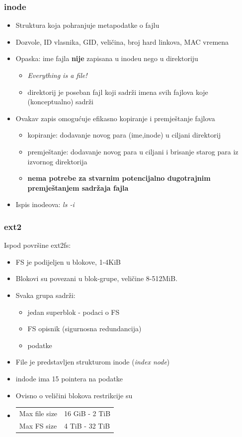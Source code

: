 \documentclass[t]{beamer}
\begin{document}
\begin{frame}
	\frametitle{inode}
	\begin{itemize}
		\item Struktura koja pohranjuje metapodatke o fajlu
		\item Dozvole, ID vlasnika, GID, veličina, broj hard linkova, MAC vremena
		\item Opaska: ime fajla \textbf{nije} zapisana u inodeu nego u direktoriju
		\begin{itemize}
			\item \emph{Everything is a file!}
			\item direktorij je poseban fajl koji sadrži imena svih fajlova koje (konceptualno) sadrži
		\end{itemize}
		\item Ovakav zapis omogućuje efikasno kopiranje i premještanje fajlova
		\begin{itemize}
			 \item kopiranje: dodavanje novog para (ime,inode) u ciljani direktorij
			 \item premještanje: dodavanje novog para u ciljani i brisanje starog para iz izvornog direktorija
			 \item \textbf{nema potrebe za stvarnim potencijalno dugotrajnim premještanjem sadržaja fajla}
		\end{itemize}
		\item Ispis inodeova: \textit{ls -i}
	\end{itemize}
\end{frame}

\begin{frame}
	\frametitle{ext2}
    Ispod površine ext2fs:

    \begin{itemize}
        \item FS je podijeljen u blokove, 1-4KiB
        \item Blokovi su povezani u blok-grupe, veličine 8-512MiB. 
        \item Svaka grupa sadrži:
        \begin{itemize}
        	\item jedan superblok - podaci o FS
        	\item FS opisnik (sigurnosna redundancija)
        	\item podatke
        \end{itemize}
        \item File je predstavljen strukturom inode (\textit{index node})
        \item indode ima 15 pointera na podatke
        \item Ovisno o veličini blokova restrikcije su
        \item[] \begin{tabular}{l l}
        	Max file size & 16 GiB - 2 TiB \\
        	Max FS size & 4 TiB - 32 TiB
        	\end{tabular}
    \end{itemize}
\end{frame}
\end{document}
